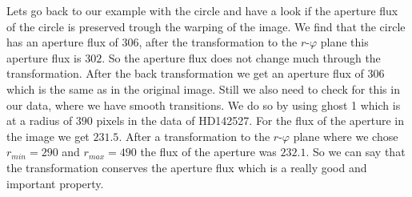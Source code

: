 Lets go back to our example with the circle and have a look if the aperture flux of the circle is preserved trough the warping of the image. We find that the circle has an aperture flux of $306$, after the transformation to the $r$-$\varphi$ plane this aperture flux is $302$. So the aperture flux does not change much through the transformation. After the back transformation we get an aperture flux of $306$ which is the same as in the original image. Still we also need to check for this in our data, where we have smooth transitions. We do so by using ghost 1 which is at a radius of $390$ pixels in the data of HD142527. For the flux of the aperture in the image we get $231.5$. After a transformation to the $r$-$\varphi$ plane where we chose $r_{min}=290$ and $r_{max}=490$ the flux of the aperture was $232.1$. So we can say that the transformation conserves the aperture flux which is a really good and important property.
